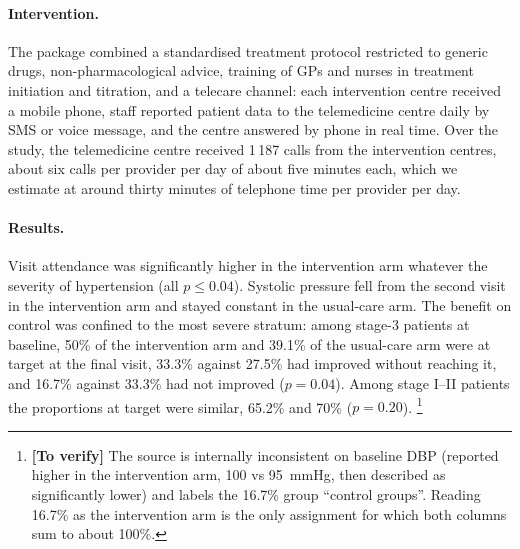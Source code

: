 \documentclass[12pt,a4paper,oneside]{report}
\newcommand{\verify}[1]{\footnote{\textbf{[To verify]} #1}}
\begin{document}
\paragraph{Intervention.} The package combined a standardised treatment protocol restricted to generic drugs, non-pharmacological advice, training of GPs and nurses in treatment initiation and titration, and a telecare channel: each intervention centre received a mobile phone, staff reported patient data to the telemedicine centre daily by SMS or voice message, and the centre answered by phone in real time. Over the study, the telemedicine centre received 1\,187 calls from the intervention centres, about six calls per provider per day of about five minutes each, which we estimate at around thirty minutes of telephone time per provider per day.

\paragraph{Results.} Visit attendance was significantly higher in the intervention arm whatever the severity of hypertension (all $p \leq 0.04$). Systolic pressure fell from the second visit in the intervention arm and stayed constant in the usual-care arm. The benefit on control was confined to the most severe stratum: among stage-3 patients at baseline, 50\% of the intervention arm and 39.1\% of the usual-care arm were at target at the final visit, 33.3\% against 27.5\% had improved without reaching it, and 16.7\% against 33.3\% had not improved ($p=0.04$). Among stage I--II patients the proportions at target were similar, 65.2\% and 70\% ($p=0.20$).%
\verify{The source is internally inconsistent on baseline DBP (reported higher in the intervention arm, 100 vs 95~mmHg, then described as significantly lower) and labels the 16.7\% group ``control groups''. Reading 16.7\% as the intervention arm is the only assignment for which both columns sum to about 100\%.}
\end{document}
